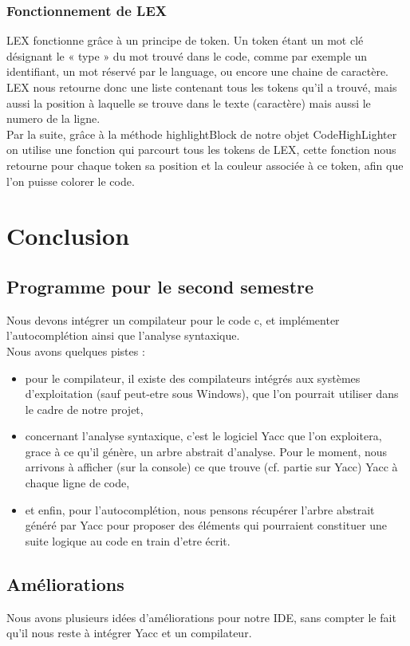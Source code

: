 \documentclass[a4paper,12pt]{article}
\begin{document}
		\subsubsection*{Fonctionnement de LEX}
		
	LEX fonctionne grâce à un principe de token. Un token étant un mot clé désignant le « type » du mot trouvé dans le code, comme par exemple un identifiant, un mot réservé par le language, ou encore une chaine de caractère. LEX nous retourne donc une liste contenant tous les tokens qu’il a trouvé, mais aussi la position à laquelle se trouve dans le texte (caractère) mais aussi le numero de la ligne.\\
	 Par la suite, grâce à la méthode highlightBlock de notre objet CodeHighLighter on utilise une fonction qui parcourt tous les tokens de LEX, cette fonction nous retourne pour chaque token sa position et la couleur associée à ce token, afin que l’on puisse colorer le code.
	
\section{Conclusion}

	\subsection{Programme pour le second semestre}
	Nous devons intégrer un compilateur pour le code c, et implémenter l'autocomplétion ainsi que l'analyse syntaxique. \\
	Nous avons quelques pistes : 
	\begin{itemize}
		\item pour le compilateur, il existe des compilateurs intégrés aux systèmes d'exploitation (sauf peut-etre sous Windows), que l'on pourrait utiliser dans le cadre de notre projet,
		\item concernant l'analyse syntaxique, c'est le logiciel Yacc que l'on exploitera, grace à ce qu'il génère, un arbre abstrait d'analyse. Pour le moment, nous arrivons à afficher (sur la console) ce que trouve (cf. partie sur Yacc) Yacc à chaque ligne de code,
		\item et enfin, pour l'autocomplétion, nous pensons récupérer l'arbre abstrait généré par Yacc pour proposer des éléments qui pourraient constituer une suite logique au code en train d'etre écrit.
	\end{itemize}
	
	\subsection{Améliorations}
	Nous avons plusieurs idées d'améliorations pour notre IDE, sans compter le fait qu'il nous reste à intégrer Yacc et un compilateur. 
	
\end{document}
